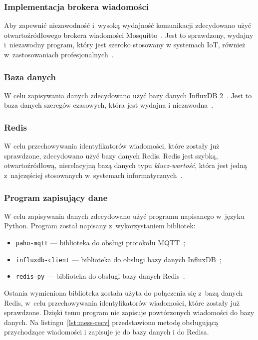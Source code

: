 \subsubsection{Implementacja brokera wiadomości}\label{impl:mosquitto}
Aby zapewnić niezawodność i~wysoką wydajność komunikacji zdecydowano użyć otwartoźródłowego brokera wiadomości Mosquitto~\cite{tool:mosquitto}.
Jest to sprawdzony, wydajny i~niezawodny program, który jest szeroko stosowany w systemach IoT, również w~zastosowaniach profesjonalnych~\cite{tool:mosquitto}.

\subsubsection{Baza danych}\label{impl:db}
W celu zapisywania danych zdecydowano użyć bazy danych InfluxDB 2~\cite{tool:influxdb}. Jest to baza danych szeregów czasowych, która jest wydajna i niezawodna~\cite{tool:influxdb}.

\subsubsection{Redis}\label{impl:redis}
W celu przechowywania identyfikatorów wiadomości, które zostały już sprawdzone, zdecydowano użyć bazy danych Redis.
Redis jest szybką, otwartoźródłową, nierelacyjną bazą danych typu \emph{klucz-wartość}, która jest jedną z~najczęściej stosowanych w~systemach informatycznych~\cite{tool:redis}.

\subsubsection{Program zapisujący dane}\label{impl:save}
W celu zapisywania danych zdecydowano użyć programu napisanego w~języku Python.
Program został napisany z~wykorzystaniem bibliotek:
\begin{itemize}
    \item \texttt{paho-mqtt} — biblioteka do obsługi protokołu MQTT~\cite{py:paho-mqtt};
    \item \texttt{influxdb-client} — biblioteka do obsługi bazy danych InfluxDB~\cite{py:influxdb};
    \item \texttt{redis-py} — biblioteka do obsługi bazy danych Redis~\cite{py:redis}.
\end{itemize}

Ostania wymieniona biblioteka została użyta do połączenia się z~bazą danych Redis, w~celu przechowywania identyfikatorów wiadomości, które zostały już sprawdzone.
Dzięki temu program nie zapisuje powtórzonych wiadomości do bazy danych.
Na listingu~\ref{lst:mess-recv} przedstawiono metodę obsługującą przychodzące wiadomości i zapisuje je do bazy danych i do Redisa.

